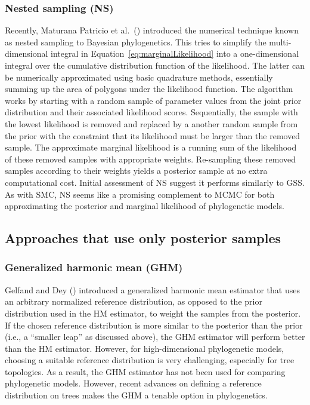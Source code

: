 \subsubsection{Nested sampling (NS)}
Recently, Maturana Patricio et al.\ (\citeyear{Maturana2017})
introduced the numerical technique known as nested sampling to Bayesian
phylogenetics.
This tries to simplify the multi-dimensional integral in
Equation~\ref{eq:marginalLikelihood}
into a one-dimensional integral over the cumulative distribution function
of the likelihood.
The latter can be numerically approximated using basic quadrature methods,
essentially summing up the area of polygons under the likelihood function.
The algorithm works by starting with a random sample of parameter values
from the joint prior distribution and their associated likelihood
scores.
Sequentially, the sample with the lowest likelihood is removed and replaced by
a another random sample from the prior with the constraint that its likelihood
must be larger than the removed sample.
The approximate marginal likelihood is a running sum of the likelihood of these
removed samples with appropriate weights.
Re-sampling these removed samples according to their weights yields a posterior
sample at no extra computational cost.
Initial assessment of NS suggest it performs similarly to GSS.
As with SMC, NS seems like a promising complement to MCMC for both
approximating the posterior and marginal likelihood of phylogenetic models.


\subsection{Approaches that use only posterior samples}

\subsubsection{Generalized harmonic mean (GHM)}
Gelfand and Dey (\citeyear{Gelfand1994}) introduced a generalized harmonic mean
estimator that uses an arbitrary normalized reference distribution, as
opposed to the prior distribution used in the HM estimator, to weight the
samples from the posterior.
If the chosen reference distribution is more similar to the posterior than the
prior (i.e., a ``smaller leap'' as discussed above), the GHM estimator will
perform better than the HM estimator.
However, for high-dimensional phylogenetic models, choosing a suitable
reference distribution is very challenging, especially for tree topologies.
As a result, the GHM estimator has not been used for comparing phylogenetic
models.
However, recent advances on defining a reference distribution on trees
\citep{Holder2014} makes the GHM a tenable option in phylogenetics.

